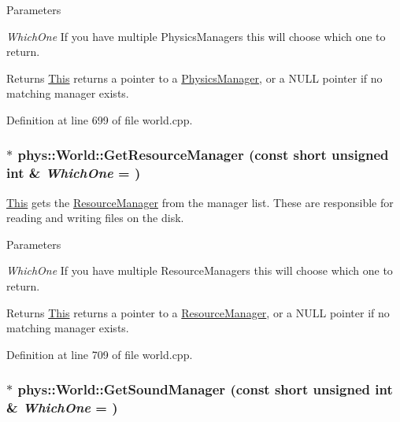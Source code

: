\begin{DoxyParams}{Parameters}
\item[{\em WhichOne}]If you have multiple PhysicsManagers this will choose which one to return. \end{DoxyParams}
\begin{DoxyReturn}{Returns}
\hyperlink{structThis}{This} returns a pointer to a \hyperlink{classphys_1_1PhysicsManager}{PhysicsManager}, or a NULL pointer if no matching manager exists. 
\end{DoxyReturn}


Definition at line 699 of file world.cpp.

\hypertarget{classphys_1_1World_a8a5381637922598411a4369be6904228}{
\subsubsection[{GetResourceManager}]{ $\ast$ phys::World::GetResourceManager (const short unsigned int \& {\em WhichOne} = {})}}
\label{da/ddf/classphys_1_1World_a8a5381637922598411a4369be6904228}


\hyperlink{structThis}{This} gets the \hyperlink{classphys_1_1ResourceManager}{ResourceManager} from the manager list. These are responsible for reading and writing files on the disk. 


\begin{DoxyParams}{Parameters}
\item[{\em WhichOne}]If you have multiple ResourceManagers this will choose which one to return. \end{DoxyParams}
\begin{DoxyReturn}{Returns}
\hyperlink{structThis}{This} returns a pointer to a \hyperlink{classphys_1_1ResourceManager}{ResourceManager}, or a NULL pointer if no matching manager exists. 
\end{DoxyReturn}


Definition at line 709 of file world.cpp.

\hypertarget{classphys_1_1World_ac662bf5d5737a99cd3bc3ff45e7d79b8}{
\subsubsection[{GetSoundManager}]{ $\ast$ phys::World::GetSoundManager (const short unsigned int \& {\em WhichOne} = {})}}
\label{da/ddf/classphys_1_1World_ac662bf5d5737a99cd3bc3ff45e7d79b8}


